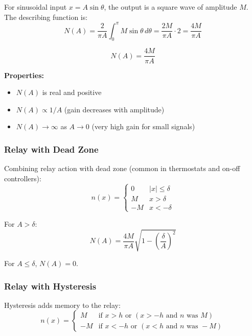 For sinusoidal input $x = A\sin\theta$, the output is a square wave of amplitude $M$. The describing function is:
\begin{equation}
N(A) = \frac{2}{\pi A} \int_0^{\pi} M \sin\theta \, d\theta = \frac{2M}{\pi A} \cdot 2 = \frac{4M}{\pi A}
\label{eq:df_relay}
\end{equation}

\begin{equation}
\boxed{N(A) = \frac{4M}{\pi A}}
\label{eq:df_relay_boxed}
\end{equation}

\textbf{Properties:}
\begin{itemize}
    \item $N(A)$ is real and positive
    \item $N(A) \propto 1/A$ (gain decreases with amplitude)
    \item $N(A) \to \infty$ as $A \to 0$ (very high gain for small signals)
\end{itemize}

\subsubsection{Relay with Dead Zone}

Combining relay action with dead zone (common in thermostats and on-off controllers):
\begin{equation}
n(x) = \begin{cases}
0 & |x| \leq \delta \\
M & x > \delta \\
-M & x < -\delta
\end{cases}
\label{eq:relay_deadzone_def}
\end{equation}

For $A > \delta$:
\begin{equation}
\boxed{N(A) = \frac{4M}{\pi A}\sqrt{1 - \left(\frac{\delta}{A}\right)^2}}
\label{eq:df_relay_deadzone}
\end{equation}

For $A \leq \delta$, $N(A) = 0$.

\subsubsection{Relay with Hysteresis}

Hysteresis adds memory to the relay:
\begin{equation}
n(x) = \begin{cases}
M & \text{if } x > h \text{ or } (x > -h \text{ and } n \text{ was } M) \\
-M & \text{if } x < -h \text{ or } (x < h \text{ and } n \text{ was } -M)
\end{cases}
\label{eq:relay_hysteresis_def}
\end{equation}

